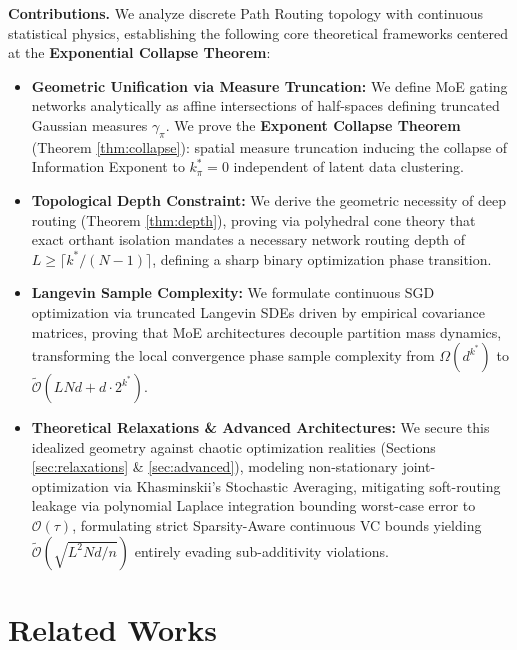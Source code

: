 \documentclass{article}
\newcommand{\1}{\mathbb{I}}
\newcommand{\calO}{\mathcal{O}}
\begin{document}
\textbf{Contributions.} We analyze discrete Path Routing topology with continuous statistical physics, establishing the following core theoretical frameworks centered at the \textbf{Exponential Collapse Theorem}:
\begin{itemize}[leftmargin=2em]
    \item \textbf{Geometric Unification via Measure Truncation:} We define MoE gating networks analytically as affine intersections of half-spaces defining truncated Gaussian measures $\gamma_\pi$. We prove the \textbf{Exponent Collapse Theorem} (Theorem \ref{thm:collapse}): spatial measure truncation inducing the collapse of Information Exponent to $k_\pi^* = 0$ independent of latent data clustering.
    \item \textbf{Topological Depth Constraint:} We derive the geometric necessity of deep routing (Theorem \ref{thm:depth}), proving via polyhedral cone theory that exact orthant isolation mandates a necessary network routing depth of $L \ge \lceil k^* / (N-1) \rceil$, defining a sharp binary optimization phase transition.
    \item \textbf{Langevin Sample Complexity:} We formulate continuous SGD optimization via truncated Langevin SDEs driven by empirical covariance matrices, proving that MoE architectures decouple partition mass dynamics, transforming the local convergence phase sample complexity from $\Omega(d^{k^*})$ to $\tilde{\calO}(LNd + d \cdot 2^{k^*})$.
    \item \textbf{Theoretical Relaxations \& Advanced Architectures:} We secure this idealized geometry against chaotic optimization realities (Sections \ref{sec:relaxations} \& \ref{sec:advanced}), modeling non-stationary joint-optimization via Khasminskii's Stochastic Averaging, mitigating soft-routing leakage via polynomial Laplace integration bounding worst-case error to $\calO(\tau)$, formulating strict Sparsity-Aware continuous VC bounds yielding $\tilde{\calO}(\sqrt{L^2 Nd/n})$ entirely evading sub-additivity violations.
\end{itemize}

\section{Related Works}
\label{sec:related_works}
\end{document}
